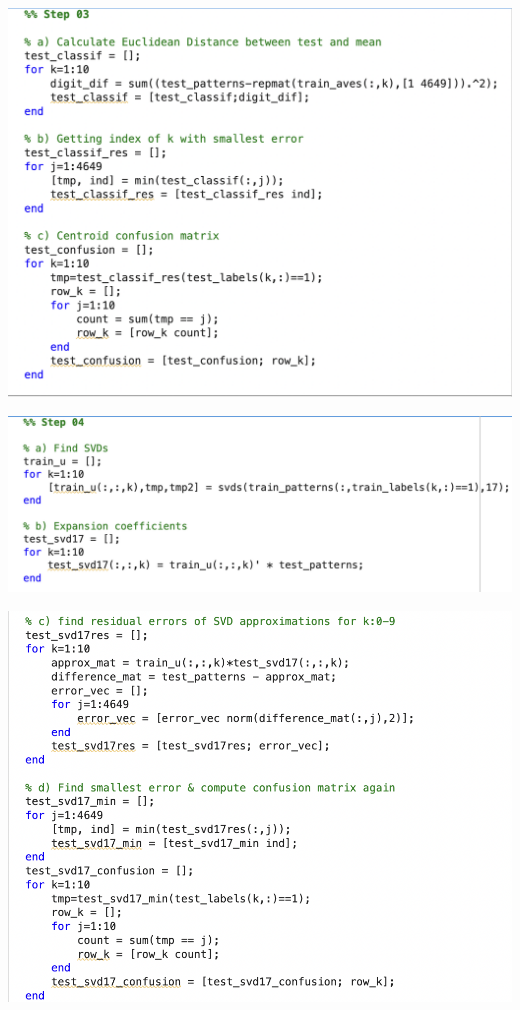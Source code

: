\documentclass[dvipsnames,12pt]{article} %
\begin{document}
      \includegraphics[scale = 0.7]{Images/MAT 167 FPP Code 2.png}

      \includegraphics[scale = 0.7]{Images/MAT 167 FPP Code 3.png}

      \includegraphics[scale = 0.8]{Images/MAT 167 FPP Code 4.png}
\end{document}
